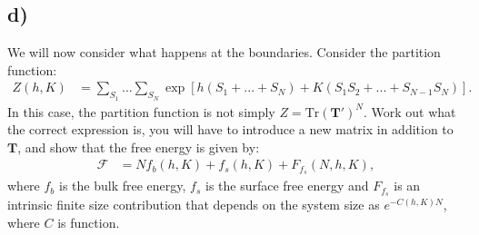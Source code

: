 \documentclass[a4paper]{article}
\newcommand{\trace}{\text{Tr}}
\begin{document}
\subsection*{d)} 
We will now consider what happens at the boundaries. Consider the partition function:
\begin{align*}
    Z(h, K) &= \sum_{S_1}...\sum_{S_N} \exp\left[h\left(S_1 + ...+ S_N\right) + K\left(S_1S_2 + ... + S_{N-1}S_N\right)\right].
\end{align*}In this case, the partition function is not simply $Z = \trace\left(\mathbf{T}'\right)^N$.
Work out what the correct expression is, you will have to introduce a new matrix in addition to $\mathbf{T}$, and show that the free energy is given by:
\begin{align*}
    \mathcal{F} &= N f_b(h, K) + f_s(h, K) + F_{f_s}(N, h, K),
\end{align*}where $f_b$ is the bulk free energy, $f_s$ is the surface free energy and $F_{f_s}$ is an intrinsic finite size contribution that depends on the system size as $e^{-C(h, K)N}$, where $C$ is function.
\end{document}
